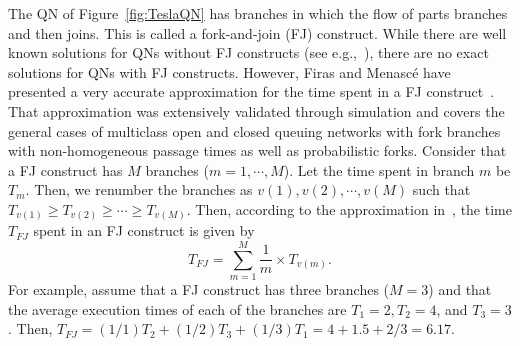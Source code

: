 \documentclass[a4paper, 12pt]{article} %
\begin{document}
The QN of Figure~\ref{fig:TeslaQN} has branches in which the flow of parts branches and then joins. This is called a fork-and-join (FJ) construct. While there are well known solutions for QNs without FJ constructs (see e.g.,~\cite{MAD2004}), there are no exact solutions for QNs with FJ constructs. However, Firas and Menasc\'e have presented a very accurate approximation for the time spent in a FJ construct~\cite{AlomariMenasce}. That approximation was extensively validated through simulation and  covers the general cases of multiclass open and closed queuing networks with fork branches with non-homogeneous passage times as well as probabilistic forks.
Consider that a FJ construct has $M$ branches ($m = 1, \cdots, M$).  Let the time spent in branch $m$ be $T_m$. Then, we renumber the branches as $v (1), v(2), \cdots, v (M)$ such that $T_{v (1)} \geq T_{v (2)} \geq \cdots \geq T_{v (M)}$. Then, according to the  approximation in~\cite{AlomariMenasce}, the time $T_{FJ}$ spent in an FJ construct is given by 
\begin{equation}
T_{FJ} = \sum_{m=1}^M \frac{1}{m} \times T_{v(m)} \label{eq:FJ}.
\end{equation}
For example, assume that a FJ construct has three branches ($M = 3$) and that the average execution times of each of the 
branches are $T_1 = 2, T_2 = 4$,  and $T_3 = 3$. Then, $T_{FJ} = (1/1) T_2 + (1/2)  T_3 + (1/3) T_1 =
4 + 1.5 + 2/3 = 6.17$.
\end{document}
